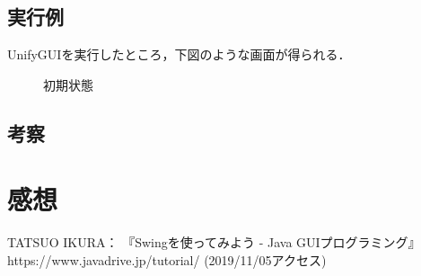 \documentclass[12pt]{jarticle}
\begin{document}
\clearpage

\subsection{実行例}
UnifyGUIを実行したところ，下図のような画面が得られる．

\begin{figure}[!hbt]
  	\begin{center}
	\end{center}
  	\caption{初期状態}
\end{figure}
\clearpage


\subsection{考察}


\section{感想}


\begin{thebibliography}{99}
TATSUO IKURA： 『Swingを使ってみよう - Java GUIプログラミング』 https://www.javadrive.jp/tutorial/ (2019/11/05アクセス) \\
\end{thebibliography}
\end{document}
